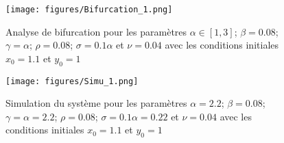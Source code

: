 \begin{figure}
    \begin{center}
		\texttt{[image: figures/Bifurcation\_1.png]}
	\end{center}
	\caption{Analyse de bifurcation pour les paramètres $\alpha \in [1, 3]$; $\beta = 0.08$; $\gamma = \alpha$; $\rho = 0.08$; $\sigma = 0.1 \alpha$ et $\nu = 0.04$ avec les conditions initiales $x_0 = 1.1$ et $y_0 = 1$}
    \label{fig:bifurc}
\end{figure}

\begin{figure}
    \begin{center}
		\texttt{[image: figures/Simu\_1.png]}
	\end{center}
	\caption{Simulation du système pour les paramètres $\alpha = 2.2$; $\beta = 0.08$; $\gamma = \alpha = 2.2$; $\rho = 0.08$; $\sigma = 0.1 \alpha = 0.22$ et $\nu = 0.04$ avec les conditions initiales $x_0 = 1.1$ et $y_0 = 1$}
    \label{fig:simu param fixes}
\end{figure}